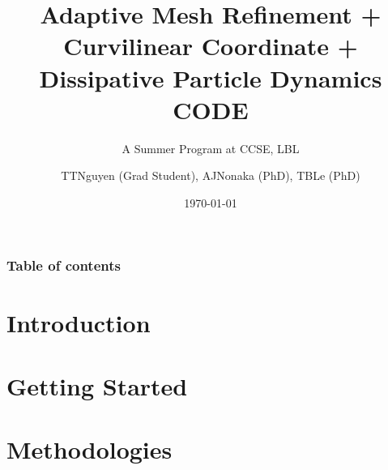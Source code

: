 \documentclass[aspectratio=169, sectionpages, codemintedoverleaf, bibref]{beamer}
\title{Adaptive Mesh Refinement + Curvilinear Coordinate + Dissipative Particle Dynamics CODE}
\subtitle{A Summer Program at CCSE, LBL}
\author{TTNguyen (Grad Student), AJNonaka (PhD), TBLe (PhD)}
\institute{Lawrence Berkeley National Laboratory}
\date{\today}
\begin{document}
\titlepage%
%

\begin{frame}
	\frametitle{Table of contents}
	\tableofcontents
\end{frame}

\section{Introduction}








\section{Getting Started}




\section{Methodologies}
\end{document}
